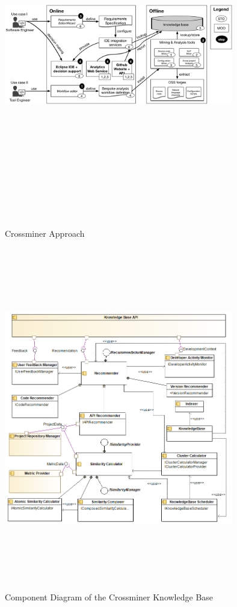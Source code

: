 \begin{figure}[H]
\includegraphics[width=10cm,height=15cm,keepaspectratio]{images/crossminer.png}
\centering
\caption{Crossminer Approach}
\label{fig:CrossminerApproach}
\end{figure}

\begin{figure}[H]
\includegraphics[width=10cm,height=15cm,keepaspectratio]{images/logicView.png}
\centering
\caption{Component Diagram of the Crossminer Knowledge Base}
\label{fig:CrossminerComponent}
\end{figure}